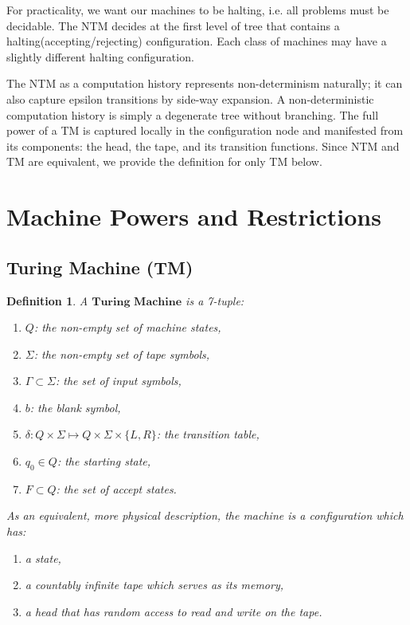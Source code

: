 \documentclass[12pt]{article}  %
\newtheorem{definition}{Definition}
\begin{document}
For practicality, we want our machines to be halting, i.e. all problems must be decidable. The NTM decides at the first level of tree that contains a halting(accepting/rejecting) configuration. Each class of machines may have a slightly different halting configuration.

The NTM as a computation history represents non-determinism naturally; it can also capture epsilon transitions by side-way expansion. A non-deterministic computation history is simply a degenerate tree without branching. The full power of a TM is captured locally in the configuration node and manifested from its components: the head, the tape, and its transition functions. Since NTM and TM are equivalent, we provide the definition for only TM below.




\section{Machine Powers and Restrictions}

\subsection{Turing Machine (TM)}

\begin{definition}
A $\textbf{Turing Machine}$ is a 7-tuple:
\begin{enumerate}
	\item $Q$: the non-empty set of machine states,
	\item $\Sigma$: the non-empty set of tape symbols,
	\item $\Gamma \subset \Sigma$: the set of input symbols,
	\item $b$: the blank symbol,
	\item $\delta: Q \times \Sigma \mapsto Q \times \Sigma \times \{L, R\} $: the transition table,
	\item $q_0 \in Q$: the starting state,
	\item $F \subset Q$: the set of accept states.
\end{enumerate}

As an equivalent, more physical description, the machine is a configuration which has:
\begin{enumerate}
	\item a state,
	\item a countably infinite tape which serves as its memory,
	\item a head that has random access to read and write on the tape.
\end{enumerate}
\end{definition}
\end{document}
